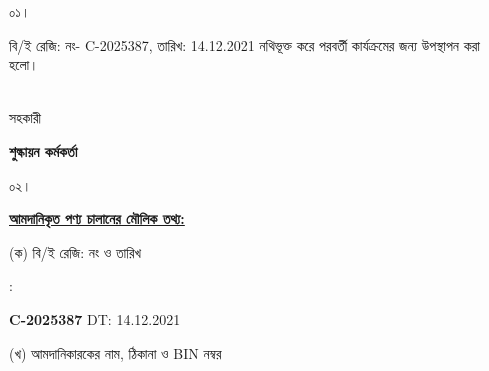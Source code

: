\documentclass[12pt]{article}
\newcommand{\beno}{C-2025387}
\newcommand{\bedt}{14.12.2021}
\begin{document}
\noindent
\begin{minipage}[t]{0.05\linewidth}
০১।
\end{minipage}
\begin{minipage}[t]{0.95\linewidth}
বি/ই রেজি: নং- {\beno}, তারিখ: {\bedt}
নথিভূক্ত করে
পরবর্তী কার্যক্রমের জন্য উপস্থাপন করা হলো।
\\
\\
\end{minipage}
\begin{minipage}[t]{0.05\linewidth}
\hspace*{0em}
\end{minipage}
\begin{minipage}[t]{0.05\linewidth}
সহকারী
\end{minipage}
\begin{minipage}[t]{0.37\linewidth}
\hspace{0em}
\end{minipage}
\begin{minipage}[t]{0.53\linewidth}
\textbf{শুল্কায়ন কর্মকর্তা}
\\
\end{minipage}
\begin{minipage}[t]{0.05\linewidth}
০২।
\end{minipage}
\begin{minipage}[t]{0.95\linewidth}
\underline{\textbf {আমদানিকৃত পণ্য চালানের
মৌলিক তথ্য:}}
\\
\end{minipage}
\footnotesize
\begin{minipage}[t]{0.05\linewidth}
\hspace*{1em}
\end{minipage}
\begin{minipage}[t]{0.40\linewidth}
(ক) বি/ই রেজি: নং ও তারিখ
\end{minipage}
\begin{minipage}[t]{0.02\linewidth}
:
\end{minipage}
\begin{minipage}[t]{0.53\linewidth}
\textbf{{\beno}} \hspace{2em} DT: {\bedt}
\\
\end{minipage}
\begin{minipage}[t]{0.05\linewidth}
\hspace*{1em}
\end{minipage}
\begin{minipage}[t]{0.40\linewidth}
(খ) আমদানিকারকের নাম, ঠিকানা
ও BIN নম্বর
\end{minipage}
\end{document}
